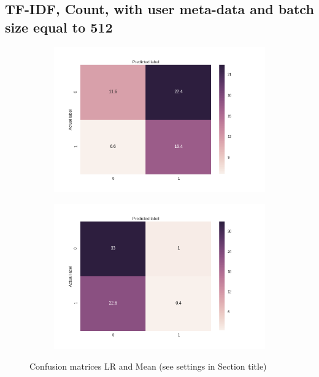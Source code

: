 \documentclass[sigconf]{acmart-txmm}
\begin{document}
\subsection{TF-IDF, Count, with user meta-data and batch size equal to 512}

\begin{figure}[H]
\centering
\begin{subfigure}
  \centering
  \includegraphics[width=1\linewidth]{report/img/conf_matrices/keywords_tfidf_count_0_1_512_LR.png}
  \label{fig:keywords_tfidf_count_0_1_512_LR}
\end{subfigure}%
\begin{subfigure}
  \centering
  \includegraphics[width=1\linewidth]{report/img/conf_matrices/keywords_tfidf_count_0_1_512_mean.png}
  \label{fig:keywords_tfidf_count_0_1_512_mean}
\end{subfigure}
\caption{Confusion matrices LR and Mean (see settings in Section title)}
\label{fig:keywords_tfidf_count_0_1_512}
\end{figure}
\end{document}
